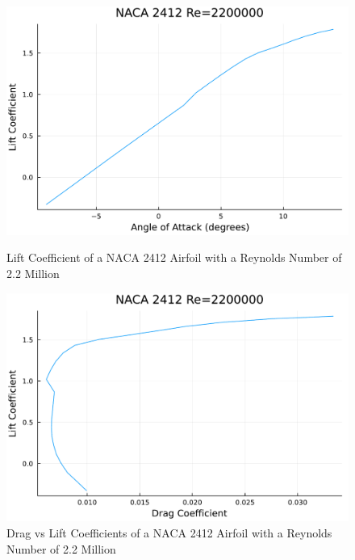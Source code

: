 \documentclass{article}
\begin{document}
\begin{figure}[h]
    \centering
\begin{minipage}[b]{0.45\textwidth}
\centering
\includegraphics[width=\textwidth]{NACA 2412 Re=2200000_Lift_Coefficent_Plot.pdf}
\caption{\label{fig:NACA 2412 Lift}Lift Coefficient of a NACA 2412 Airfoil with a Reynolds Number of 2.2 Million}
\end{minipage}
\begin{minipage}[b]{0.45\textwidth}
\centering
\includegraphics[width=\textwidth]{NACA 2412 Re=2200000_Drag_vs_Lift_Coefficent_Plot.pdf}
\caption{\label{fig:NACA 2412 Drag}Drag vs Lift Coefficients of a NACA 2412 Airfoil with a Reynolds Number of 2.2 Million}
\end{minipage}
\end{figure}
\end{document}
